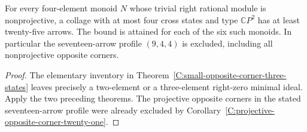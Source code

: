 \begin{corollary}
\label{C:nonprojective-four-corners-four-states}
For every four-element monoid $N$ whose trivial right rational
module is nonprojective, a collage with at most four cross
states and type $\mathbb CP^2$ has at least twenty-five arrows.
The bound is attained for each of the six such monoids.
In particular the seventeen-arrow profile $(9,4,4)$ is
excluded, including all nonprojective opposite corners.
\end{corollary}
\begin{proof}
The elementary inventory in
Theorem~\ref{C:small-opposite-corner-three-states} leaves
precisely a two-element or a three-element right-zero minimal
ideal. Apply the two preceding theorems. The projective
opposite corners in the stated seventeen-arrow profile were
already excluded by
Corollary~\ref{C:projective-opposite-corner-twenty-one}.
\end{proof}
